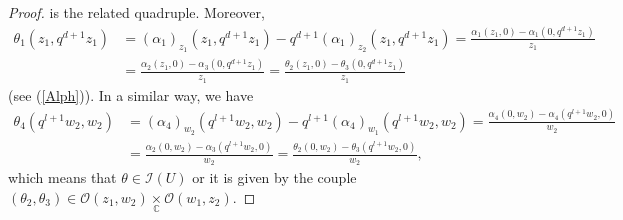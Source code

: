 \documentclass[12pt,reqno]{amsart}%
\theoremstyle{plain}
\numberwithin{theorem}{section} \numberwithin{equation}{section}
\numberwithin{lemma}{section}
\numberwithin{remark}{section}
\numberwithin{example}{section}
\numberwithin{proposition}{section}
\numberwithin{definition}{section}
\numberwithin{corollary}{section}
\begin{document}
\begin{proof}
is the related quadruple. Moreover,
\begin{align*}
\theta_{1}\left(  z_{1},q^{d+1}z_{1}\right)   &  =\left(  \alpha_{1}\right)
_{z_{1}}\left(  z_{1},q^{d+1}z_{1}\right)  -q^{d+1}\left(  \alpha_{1}\right)
_{z_{2}}\left(  z_{1},q^{d+1}z_{1}\right)  =\frac{\alpha_{1}\left(
z_{1},0\right)  -\alpha_{1}\left(  0,q^{d+1}z_{1}\right)  }{z_{1}}\\
&  =\frac{\alpha_{2}\left(  z_{1},0\right)  -\alpha_{3}\left(  0,q^{d+1}%
z_{1}\right)  }{z_{1}}=\frac{\theta_{2}\left(  z_{1},0\right)  -\theta
_{3}\left(  0,q^{d+1}z_{1}\right)  }{z_{1}}%
\end{align*}
(see (\ref{Alph})). In a similar way, we have\
\begin{align*}
\theta_{4}\left(  q^{l+1}w_{2},w_{2}\right)   &  =\left(  \alpha_{4}\right)
_{w_{2}}\left(  q^{l+1}w_{2},w_{2}\right)  -q^{l+1}\left(  \alpha_{4}\right)
_{w_{1}}\left(  q^{l+1}w_{2},w_{2}\right)  =\frac{\alpha_{4}\left(
0,w_{2}\right)  -\alpha_{4}\left(  q^{l+1}w_{2},0\right)  }{w_{2}}\\
&  =\frac{\alpha_{2}\left(  0,w_{2}\right)  -\alpha_{3}\left(  q^{l+1}%
w_{2},0\right)  }{w_{2}}=\frac{\theta_{2}\left(  0,w_{2}\right)  -\theta
_{3}\left(  q^{l+1}w_{2},0\right)  }{w_{2}},
\end{align*}
which means that $\theta\in\mathcal{I}\left(  U\right)  $ or it is given by
the couple $\left(  \theta_{2},\theta_{3}\right)  \in\mathcal{O}\left(
z_{1},w_{2}\right)  \underset{\mathbb{C}}{\times}\mathcal{O}\left(
w_{1},z_{2}\right)  $.


\end{proof}
\end{document}
